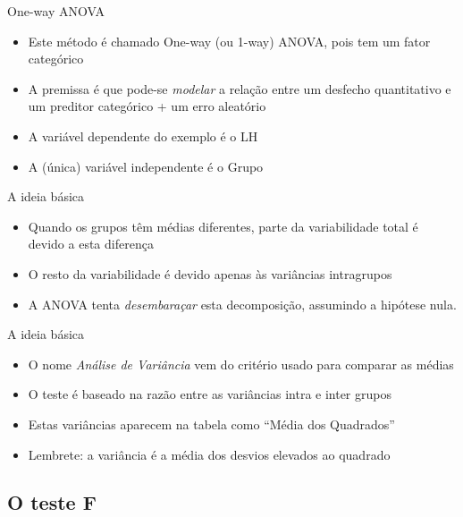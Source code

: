 \documentclass{beamer}
\begin{document}
\begin{frame}{One-way ANOVA}
  \begin{itemize}
    \small
  \item Este método é chamado One-way (ou 1-way) ANOVA, pois tem um fator categórico
    \bigskip
  \item A premissa é que pode-se {\em modelar} a relação entre um desfecho quantitativo e um preditor categórico + um erro aleatório
    \bigskip
    \bigskip
  \item A variável dependente do exemplo é o LH
  \item A (única) variável independente é o Grupo
  \end{itemize}
\end{frame}

\begin{frame}{A ideia básica}
  \begin{itemize}
    \footnotesize
  \item Quando os grupos têm médias diferentes, parte da variabilidade total é devido a esta diferença
  \item O resto da variabilidade é devido apenas às variâncias intragrupos
    \bigskip
    \bigskip
  \item A ANOVA tenta {\em desembaraçar} esta decomposição, assumindo a hipótese nula.
  \end{itemize}
\end{frame}

\begin{frame}{A ideia básica}
  \begin{itemize}
    \footnotesize
  \item O nome {\em Análise de Variância} vem do critério usado para comparar as médias
    \bigskip
    \bigskip
  \item O teste é baseado na razão entre as variâncias intra e inter grupos
  \item Estas variâncias aparecem na tabela como ``Média dos Quadrados''
    \bigskip
    \bigskip
  \item Lembrete: a variância é a média dos desvios elevados ao quadrado
  \end{itemize}
\end{frame}

\subsection{O teste F}
\end{document}
